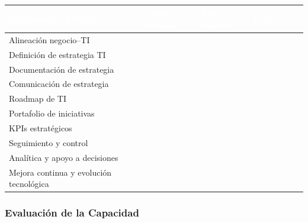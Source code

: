 \documentclass[11pt]{article}
\newcounter{none} %
\begin{document}
\vspace{0.3cm}
\setlength{\tabcolsep}{5pt}
\renewcommand{\arraystretch}{1.5}
{\def\LTcaptype{none}
\begin{longtable}[]{@{}
  >{\raggedright\arraybackslash}p{0.46\linewidth}
  >{\centering\arraybackslash}p{0.18\linewidth}
  >{\centering\arraybackslash}p{0.18\linewidth}
  >{\centering\arraybackslash}p{0.18\linewidth}@{}}
\rowcolor{DeepNavy}
\textcolor{white}{\textbf{Componente APO02}} & \textcolor{white}{\textbf{Nivel actual}} & \textcolor{white}{\textbf{Nivel objetivo}} & \textcolor{white}{\textbf{GAP}} \\ \hline
\endhead
\rowcolor{LightGray}
Alineación negocio--TI & 2 & 4 & 2 \\ \hline
Definición de estrategia TI & 2 & 4 & 2 \\ \hline
\rowcolor{LightGray}
Documentación de estrategia & 2 & 4 & 2 \\ \hline
Comunicación de estrategia & 1 & 3 & 2 \\ \hline
\rowcolor{LightGray}
Roadmap de TI & 1 & 4 & 3 \\ \hline
Portafolio de iniciativas & 1 & 4 & 3 \\ \hline
\rowcolor{LightGray}
KPIs estratégicos & 1 & 4 & 3 \\ \hline
Seguimiento y control & 1 & 4 & 3 \\ \hline
\rowcolor{LightGray}
Analítica y apoyo a decisiones & 0 & 4 & 4 \\ \hline
Mejora continua y evolución tecnológica & 1 & 5 & 4 \\ \hline
\end{longtable}
}

\subsubsection{Evaluación de la Capacidad}
\end{document}
